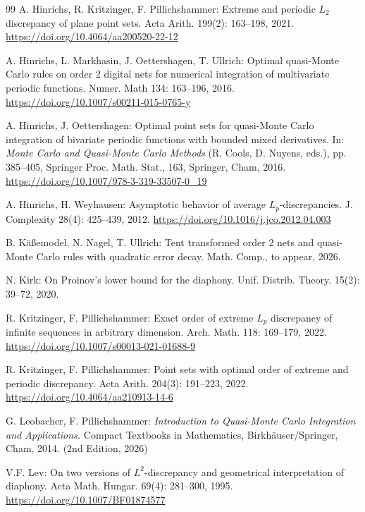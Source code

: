 \documentclass[12pt, a4paper]{article}
\begin{document}
\begin{thebibliography}{99}
 A. Hinrichs, R. Kritzinger, F. Pillichshammer: Extreme and periodic $L_2$ discrepancy of plane point sets. Acta Arith. 199(2): 163--198, 2021. \href{https://doi.org/10.4064/aa200520-22-12}{https://doi.org/10.4064/aa200520-22-12} 

 A. Hinrichs, L. Markhasin, J. Oettershagen, T. Ullrich: Optimal quasi-Monte Carlo rules on order 2 digital nets for numerical integration of multivariate periodic functions. Numer. Math 134: 163--196, 2016. \href{https://doi.org/10.1007/s00211-015-0765-y}{https://doi.org/10.1007/s00211-015-0765-y}

 A. Hinrichs, J. Oettershagen: Optimal point sets for quasi-Monte Carlo integration of bivariate periodic functions with bounded mixed derivatives. In: {\it Monte Carlo and Quasi-Monte Carlo Methods} (R. Cools, D. Nuyens, eds.), pp. 385--405, Springer Proc. Math. Stat., 163, Springer, Cham, 2016. \href{https://doi.org/10.1007/978-3-319-33507-0_19}{https://doi.org/10.1007/978-3-319-33507-0\_19}

 A. Hinrichs, H. Weyhausen: Asymptotic behavior of average $L_p$-discrepancies. J. Complexity 28(4): 425--439, 2012. \href{https://doi.org/10.1016/j.jco.2012.04.003}{https://doi.org/10.1016/j.jco.2012.04.003}

 B. K\"a{\ss}emodel, N. Nagel, T. Ullrich: Tent transformed order 2 nets and quasi-Monte Carlo rules with quadratic error decay. Math. Comp., to appear, 2026.

 N. Kirk: On Proinov's lower bound for the diaphony. Unif. Distrib. Theory. 15(2): 39--72, 2020.

 R. Kritzinger, F. Pillichshammer: Exact order of extreme $L_p$ discrepancy of infinite sequences in arbitrary dimension. Arch. Math. 118: 169--179, 2022. \href{https://doi.org/10.1007/s00013-021-01688-9}{https://doi.org/10.1007/s00013-021-01688-9}

 R. Kritzinger, F. Pillichshammer: Point sets with optimal order of extreme and periodic discrepancy. Acta Arith. 204(3): 191--223, 2022. \href{https://doi.org/10.4064/aa210913-14-6}{https://doi.org/10.4064/aa210913-14-6}

 G. Leobacher, F. Pillichshammer: {\it Introduction to Quasi-Monte Carlo Integration and Applications.} Compact Textbooks in Mathematics, Birkh\"auser/Springer, Cham, 2014. (2nd Edition, 2026)

  V.F. Lev: On two versions of $L^2$-discrepancy and geometrical interpretation of diaphony. Acta Math. Hungar. 69(4): 281--300, 1995. \href{https://doi.org/10.1007/BF01874577}{https://doi.org/10.1007/BF01874577}


\end{thebibliography}
\end{document}

